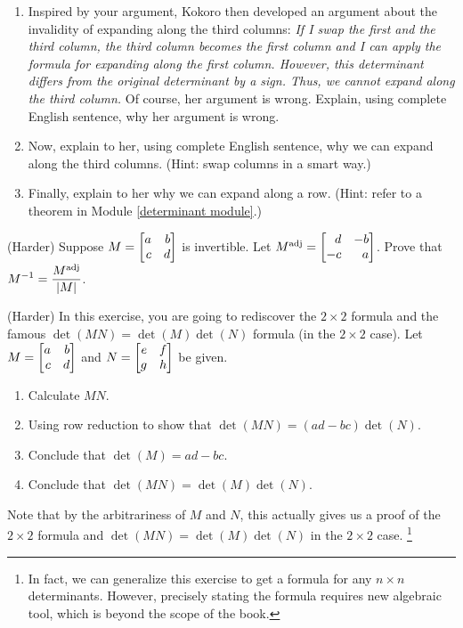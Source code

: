 \begin{exercises}
\begin{problist}
\begin{enumerate}
			\item Inspired by your argument, Kokoro then developed an argument
				about the invalidity of expanding along the third columns: \emph{If
				I swap the first and the third column, the third column becomes
				the first column and I can apply the formula for expanding along
				the first column. However, this determinant differs from the
				original determinant by a sign. Thus, we cannot expand along the
				third column.} Of course, her argument is wrong. Explain, using complete
				English sentence, why her argument is wrong.

			\item Now, explain to her, using complete English sentence, why we
				can expand along the third columns. (Hint: swap columns in a smart
				way.)

			\item Finally, explain to her why we can expand along a row. (Hint: refer
				to a theorem in Module \ref{determinant module}.)
		\end{enumerate}
        \prob (Harder) Suppose $M=\mat{a & b \\ c & d}$ is invertible. Let $M^{\text{adj}}
		=\mat{d & -b \\ -c & a}$. Prove that
		$\displaystyle M^{-1}=\frac{M^{\text{adj}}}{\lvert M\rvert}$. 
		
		\prob (Harder) In this exercise, you are going to rediscover the $2\times
		2$ formula and the famous $\det(MN)=\det(M)\det(N)$ formula (in the
		$2\times 2$ case). Let $M=\mat{a & b \\ c & d}$ and
		$N=\mat{e & f \\ g & h}$ be given.
		\begin{enumerate}
			\item Calculate $MN$.

			\item Using row reduction to show that $\det(MN)=(ad-bc)\det(N)$.

			\item Conclude that $\det(M)=ad-bc$.

			\item Conclude that $\det(MN)=\det(M)\det(N)$.
		\end{enumerate}
		Note that by the arbitrariness of $M$ and $N$, this actually gives us a
		proof of the $2\times 2$ formula and $\det(MN)=\det(M)\det(N)$ in the
		$2\times 2$ case. \footnote{In fact, we can generalize this exercise to
		get a formula for any $n\times n$ determinants. However, precisely
		stating the formula requires new algebraic tool, which is beyond the scope
		of the book.}
	\end{problist}
\end{exercises} 